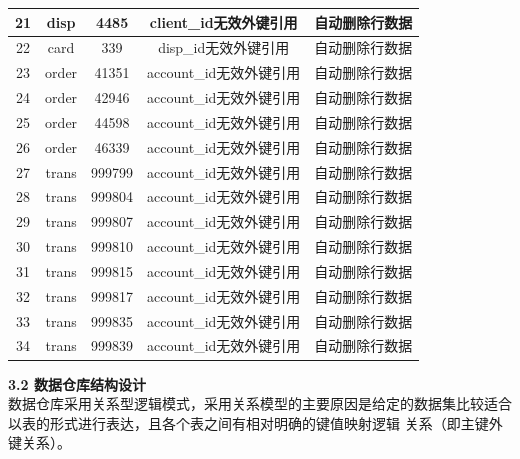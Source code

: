 \documentclass[a4paper]{article}
\begin{document}
\begin{enumerate}
\begin{center}
{\begin{tabular}{c|c|c|c|c}
      21&disp&4485& client\_id无效外键引用&自动删除行数据\\ \hline
      22&card&339& disp\_id无效外键引用&自动删除行数据\\ \hline
      23&order&41351& account\_id无效外键引用&自动删除行数据\\ \hline
      24&order&42946& account\_id无效外键引用&自动删除行数据\\ \hline
      25&order&44598& account\_id无效外键引用&自动删除行数据\\ \hline

      26&order&46339& account\_id无效外键引用&自动删除行数据\\ \hline
      27&trans&999799& account\_id无效外键引用&自动删除行数据\\ \hline
      28&trans&999804& account\_id无效外键引用&自动删除行数据\\ \hline
      29&trans&999807& account\_id无效外键引用&自动删除行数据\\ \hline
      30&trans&999810& account\_id无效外键引用&自动删除行数据\\ \hline

      31&trans&999815& account\_id无效外键引用&自动删除行数据\\ \hline
      32&trans&999817& account\_id无效外键引用&自动删除行数据\\ \hline
      33&trans&999835& account\_id无效外键引用&自动删除行数据\\ \hline
      34&trans&999839& account\_id无效外键引用&自动删除行数据\\ \hline\hline
    \end{tabular}
    }
  \end{center}

  \medskip
  \textbf{3.2 数据仓库结构设计}\\
  \medskip
  数据仓库采用关系型逻辑模式，采用关系模型的主要原因是给定的数据集比较适合以表的形式进行表达，且各个表之间有相对明确的键值映射逻辑
  关系（即主键外键关系）。
  

\end{enumerate}
\end{document}
